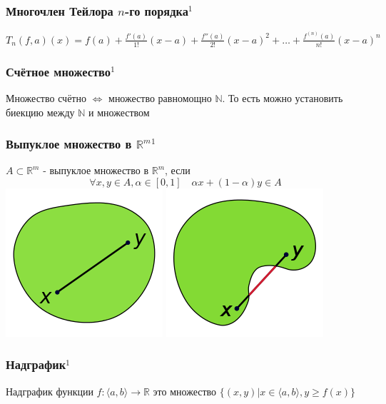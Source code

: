 \documentclass{article}
\begin{document}
\subsubsection{Многочлен Тейлора \texorpdfstring{$n$}{n}-го порядка\texorpdfstring{$^1$}{}}
$T_n(f, a)(x) = f(a) + \frac{f'(a)}{1!}(x-a)  + \frac{f''(a)}{2!}(x-a)^2 + \ldots+ \frac{f^{(n)}(a)}{n!}(x-a)^n$


\subsubsection{Счётное множество\texorpdfstring{$^1$}{}}
Множество счётно $\Leftrightarrow$ множество равномощно $\mathbb{N}$. 
То есть можно установить биекцию между $\mathbb{N}$ и множеством


\subsubsection{Выпуклое множество в \texorpdfstring{$\mathbb{R}^m$}{m-мерном R}\texorpdfstring{$^1$}{}}
$A \subset \mathbb{R}^m$ - выпуклое множество в $\mathbb{R}^m$, если 
$$
\forall x, y \in A, \alpha \in [0, 1] \quad \alpha x + (1 - \alpha) y \in A
$$
\includegraphics[scale=0.9]{convex}
\includegraphics[scale=0.9]{non-convex}


\subsubsection{Надграфик\texorpdfstring{$^1$}{}}
Надграфик функции $f: \langle a, b \rangle \rightarrow \mathbb{R}$ это множество $\{(x, y)|x\in \langle a, b\rangle, y \ge f(x)\}$
\end{document}
